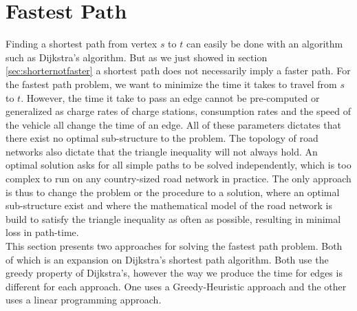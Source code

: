 \section{Fastest Path}
Finding a shortest path from vertex $s$ to $t$ can easily be done with an algorithm such as Dijkstra's algorithm. But as we just showed in section \ref{sec:shorternotfaster} a shortest path does not necessarily imply a faster path. For the fastest path problem, we want to minimize the time it takes to travel from $s$ to $t$. However, the time it take to pass an edge cannot be pre-computed or generalized as charge rates of charge stations, consumption rates and the speed of the vehicle all change the time of an edge. All of these parameters dictates that there exist no optimal sub-structure to the problem. The topology of road networks also dictate that the triangle inequality will not always hold. An optimal solution asks for all simple paths to be solved independently, which is too complex to run on any country-sized road network in practice. The only approach is thus to change the problem or the procedure to a solution, where an optimal sub-structure exist and where the mathematical model of the road network is build to satisfy the triangle inequality as often as possible, resulting in minimal loss in path-time.\\

This section presents two approaches for solving the fastest path problem. Both of which is an expansion on Dijkstra's shortest path algorithm. Both use the greedy property of Dijkstra's, however the way we produce the time for edges is different for each approach. One uses a Greedy-Heuristic approach and the other uses a linear programming approach.